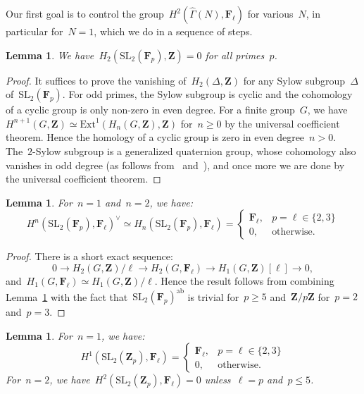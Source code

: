 \documentclass[10pt]{amsart}
\def\Gammah{\widehat{\Gamma}}
\def\Ext{\mathrm{Ext}}
\def\F{\mathbf{F}}
\def\Z{\mathbf{Z}}
\newtheorem{lemma}[subsubsection]{Lemma}
\theoremstyle{remark}
\numberwithin{equation}{subsection}
\def\SL{\mathrm{SL}}
\begin{document}
Our first goal is to control the
group~$H^2(\Gammah(N),\F_{\ell})$ for various~$N$, in particular for~$N=1$, which we do in a sequence
of steps.



\begin{lemma} \label{lemmaone}
We have~$H_2(\SL_2(\F_p),\Z) = 0$ for all primes~$p$. 
\end{lemma}

\begin{proof}
It suffices to prove the vanishing of~$H_2(\Delta,\Z)$
for any Sylow subgroup~$\Delta$ of~$\SL_2(\F_p)$. For odd primes, the Sylow
subgroup is cyclic and the cohomology of a cyclic group is only non-zero
in even degree. 
For a finite group~$G$, we have~$H^{n+1}(G,\Z) \simeq \Ext^1(H_{n}(G,\Z),\Z)$ for~$n \ge 0$ by
the universal coefficient theorem.
Hence  the homology of a cyclic group is zero in even degree~$n >0$.
The~$2$-Sylow subgroup is a generalized quaternion group,
whose cohomology also vanishes in odd degree
(as follows from~\cite[Satz~25.3(a), p.643]{Huppert}
and~\cite[Theorem~2]{Swan}), and once more we are done by the universal coefficient theorem.
\end{proof}



\begin{lemma}  \label{firstlemma}
For~$n=1$ and~$n=2$, we have:
$$H^n(\SL_2(\F_p),\F_{\ell})^{\vee} \simeq H_n(\SL_2(\F_p),\F_{\ell}) = 
\begin{cases} \F_{\ell}, & p=\ell \in \{2,3\} \\
0, & \text{otherwise}. \end{cases}
$$
\end{lemma}

\begin{proof} 
There is a short exact sequence:
$$0 \rightarrow H_2(G,\Z)/\ell \rightarrow H_2(G,\F_{\ell}) \rightarrow H_1(G,\Z)[\ell] \rightarrow 0,$$
and~$H_1(G,\F_{\ell}) \simeq H_1(G,\Z)/\ell$. Hence the result follows from combining
Lemma~\ref{lemmaone} with the fact that~$\SL_2(\F_p)^{\mathrm{ab}}$ is trivial
for~$p \ge 5$ and~$\Z/p\Z$ for~$p=2$ and~$p=3$.
\end{proof}

\begin{lemma} \label{forkunneth}
 For~$n=1$, we have:
$$H^1(\SL_2(\Z_p),\F_{\ell})  = 
\begin{cases} \F_{\ell}, & p=\ell \in \{2,3\} \\
0, & \text{otherwise}. \end{cases}
$$
For~$n =2$, we have~$H^2(\SL_2(\Z_p),\F_{\ell}) = 0$ unless~$\ell = p$ and~$p \le 5$. 
\end{lemma}
\end{document}
